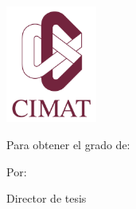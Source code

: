 
\begin{titlepage}

{\sffamily

\begin{center}

\includegraphics[width=30mm]{figures/logo}

\vfill\vfill\vfill
{\LARGE \mynamecimat}

\vfill\vfill\vfill

{\LARGE\bfseries\mytitle}


\vfill\vfill\vfill
Para obtener el grado de:

{\Large \bfseries \mydegreeprogramme}

\vfill\vfill\vfill
{\large Por:}

\myauthor

{\large Director de tesis}

\mysupervisor

{\small \mysupervisorinfo}


















\vfill\vfill\vfill

\mysubmissionmonth~\mysubmissionyear

\end{center}
}%
\end{titlepage}

